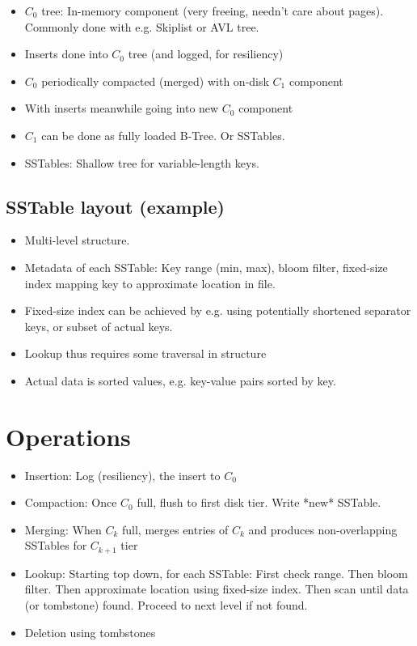 \documentclass[a4paper]{scrreprt}
\begin{document}
\begin{itemize}
		\item $C_0$ tree: In-memory component (very freeing, needn't care about
				pages). Commonly done with e.g. Skiplist or AVL tree.
		\item Inserts done into $C_0$ tree (and logged, for resiliency)
		\item $C_0$ periodically compacted (merged) with on-disk $C_1$ component
		\item With inserts meanwhile going into new $C_0$ component
		\item $C_1$ can be done as fully loaded B-Tree. Or SSTables.
		\item SSTables: Shallow tree for variable-length keys.
\end{itemize}

\subsection{SSTable layout (example)}

\begin{itemize}
		\item Multi-level structure.
		\item Metadata of each SSTable: Key range (min, max), bloom filter,
				fixed-size index mapping key to approximate location in file.
		\item Fixed-size index can be achieved by e.g. using potentially
				shortened separator keys, or subset of actual keys.
		\item Lookup thus requires some traversal in structure
		\item Actual data is sorted values, e.g. key-value pairs sorted by key.
\end{itemize}

\section{Operations}

\begin{itemize}
		\item Insertion: Log (resiliency), the insert to $C_0$
		\item Compaction: Once $C_0$ full, flush to first disk tier. Write
				*new* SSTable.
		\item Merging: When $C_k$ full, merges entries of $C_k$ and produces
				non-overlapping SSTables for $C_{k+1}$ tier
		\item Lookup: Starting top down, for each SSTable: First check range.
				Then bloom filter. Then approximate location using fixed-size
				index. Then scan until data (or tombstone) found. Proceed to
				next level if not found.
		\item Deletion using tombstones
\end{itemize}


\printbibliography
\end{document}
